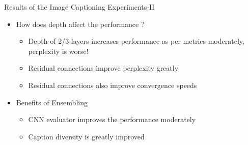 \documentclass{beamer}
\begin{document}
\begin{frame}{Results of the Image Captioning Experiments-II}
\begin{itemize}
    \item How does depth affect the performance ?
       \begin{itemize}
           \item<2-> Depth of 2/3 layers increases performance as per metrics moderately, perplexity is worse!
           \item<3-> Residual connections improve perplexity greatly 
           \item<4-> Residual connections also improve convergence speeds 
       \end{itemize}
    \item Benefits of Ensembling  
       \begin{itemize}
        \item<5-> CNN evaluator improves the performance moderately  
        \item<6-> Caption diversity is greatly improved 
       \end{itemize}
\end{itemize}
\end{frame}
\end{document}
